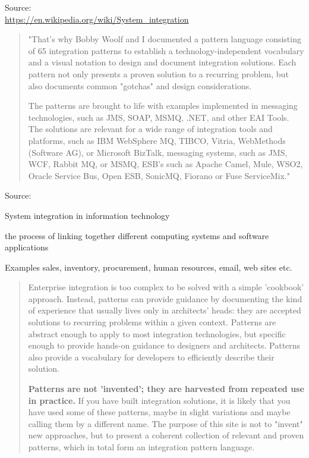 \documentclass[Screen16to9,17pt]{foils}
\begin{document}
Source:\\
\url{https://en.wikipedia.org/wiki/System_integration}





\begin{quote}
"That's why Bobby Woolf and I documented a pattern language consisting of 65 integration patterns to establish a technology-independent vocabulary and a visual notation to design and document integration solutions. Each pattern not only presents a proven solution to a recurring problem, but also documents common "gotchas" and design considerations.

The patterns are brought to life with examples implemented in messaging technologies, such as JMS, SOAP, MSMQ, .NET, and other EAI Tools. The solutions are relevant for a wide range of integration tools and platforms, such as IBM WebSphere MQ, TIBCO, Vitria, WebMethods (Software AG), or Microsoft BizTalk, messaging systems, such as JMS, WCF, Rabbit MQ, or MSMQ, ESB's such as Apache Camel, Mule, WSO2, Oracle Service Bus, Open ESB, SonicMQ, Fiorano or Fuse ServiceMix."
\end{quote}

Source:\\


\begin{list2}
\item System integration in information technology
\item the process of linking together different computing systems and software applications
\item Examples sales, inventory, procurement, human resources, email, web sites etc.
\end{list2}



\begin{quote}
Enterprise integration is too complex to be solved with a simple 'cookbook' approach. Instead, patterns can provide guidance by documenting the kind of experience that usually lives only in architects' heads: they are accepted solutions to recurring problems within a given context. Patterns are abstract enough to apply to most integration technologies, but specific enough to provide hands-on guidance to designers and architects. Patterns also provide a vocabulary for developers to efficiently describe their solution.

{\bf
Patterns are not 'invented'; they are harvested from repeated use in practice.} If you have built integration solutions, it is likely that you have used some of these patterns, maybe in slight variations and maybe calling them by a different name. The purpose of this site is not to "invent" new approaches, but to present a coherent collection of relevant and proven patterns, which in total form an integration pattern language.
\end{quote}
\end{document}
